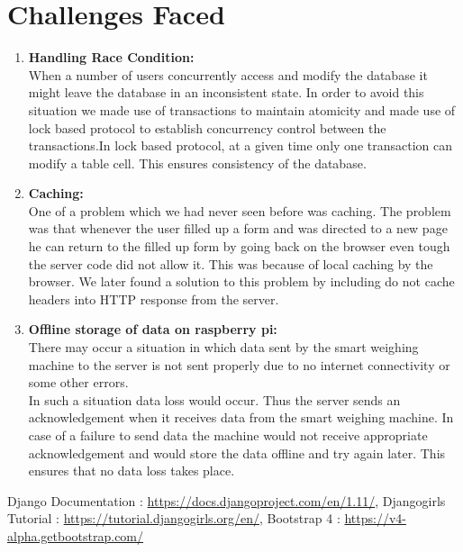 \documentclass[a4paper,12pt,oneside]{book}
\begin{document}
		\section{Challenges Faced}
		\begin{enumerate}
			\item  \textbf{Handling Race Condition:}\\
			When a number of users concurrently access and modify the database it might leave the database in an inconsistent state. In order to avoid this situation we made use of transactions to maintain atomicity and made use of lock based protocol to establish concurrency control between the transactions.In lock based protocol, at a given time only one transaction can modify a table cell. This ensures consistency of the database. 
			
			\item \textbf{Caching:}\\
			One of a problem which we had never seen before was caching. The problem was that whenever the user filled up a form and was directed to a new page he can return to the filled up form by going back on the browser even tough the server code did not allow it. This was because of local caching by the browser. We later found a solution to this problem by including do not cache headers into HTTP response from the server.
			
			\item \textbf{Offline storage of data on raspberry pi:}\\
			There may occur a situation in which data sent by the smart weighing machine to the server is not sent properly due to no internet connectivity or some other errors.\\
			In such a situation data loss would occur. Thus the server sends an acknowledgement when it receives data from the smart weighing machine. In case of a failure to send data the machine would not receive appropriate acknowledgement and would store the data offline and try again later. This ensures that no data loss takes place.
			
		\end{enumerate}
		
		\begin{thebibliography}{li}
			\bibitem{}
			Django Documentation :
			{\href{https://docs.djangoproject.com/en/1.11/}{https://docs.djangoproject.com/en/1.11/}},
			\bibitem{}
			Djangogirls Tutorial :
			{\href{https://tutorial.djangogirls.org/en/}{https://tutorial.djangogirls.org/en/}},
			\bibitem{}
			Bootstrap 4 :
			{\href{https://v4-alpha.getbootstrap.com/}{https://v4-alpha.getbootstrap.com/}}
		\end{thebibliography}
		
		
	
\end{document}
